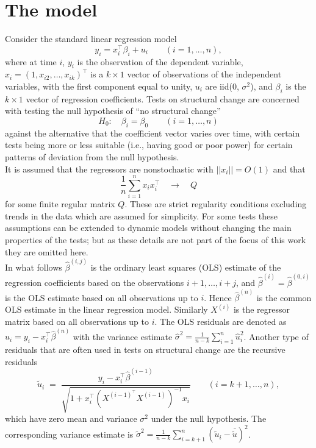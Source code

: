 \documentclass[10pt,a4paper]{article}
\begin{document}
\section{The model} \label{sec:model}
Consider the standard linear regression model
\begin{equation} \label{model1} y_i = x_i^\top \beta_i + u_i
\qquad (i = 1, \dots, n), \end{equation}
where at time $i$, $y_i$ is the observation of the dependent
variable, $x_i = (1, x_{i2}, \dots, x_{ik})^\top$ is a $k \times 1$ vector of
observations of the independent variables, with the first component equal to
unity, $u_i$ are iid(0, $\sigma^2$), and $\beta_i$ is the $k \times 1$ vector of
regression coefficients. Tests on structural change are concerned with testing
the null hypothesis of ``no structural change''
\begin{equation} \label{null-hypothesis}
H_0: \quad \beta_i = \beta_0 \qquad (i = 1, \dots, n)
\end{equation}
against
the alternative that the coefficient vector varies over time, with
certain tests being more or less suitable (i.e., having good or poor power) for
certain patterns of deviation from the null hypothesis.\\

It is assumed
that the regressors are nonstochastic with $||x_i|| = O(1)$ and that
\begin{equation} \label{A5} \frac{1}{n} \sum_{i=1}^n x_i x_i^\top \quad
\longrightarrow \quad Q\end{equation}
for some finite regular matrix $Q$. These
are strict regularity conditions excluding trends in the data which are assumed
for simplicity. For some tests these assumptions can be
extended to dynamic models without changing the main properties of the tests;
but as these details are not part of the focus of this work they are omitted
here.\\

In what follows $\hat \beta^{(i, j)}$ is the ordinary least
squares (OLS) estimate of the regression coefficients based on the
observations $i+1, \dots, i+j$, and $\hat \beta^{(i)} = \hat \beta^{(0,i)}$ is
the OLS estimate based on all observations up to $i$. Hence $\hat \beta^{(n)}$
is the common OLS estimate in the linear regression model.
Similarly $X^{(i)}$ is the regressor matrix based on all observations up to $i$.
The OLS residuals
are denoted as $\hat u_i = y_i - x_i^\top \hat \beta^{(n)}$ with the
variance estimate $\hat{\sigma}^2 = \frac{1}{n-k}
\sum_{i=1}^n \hat u_i^2$. Another type of residuals that are often used in
tests on structural change are the recursive residuals \begin{equation}
\label{rr} \tilde u_i \; = \; \frac{y_i - x_i^\top \hat
\beta^{(i-1)}}{\sqrt{1+x_i^\top \left(X^{(i-1)^\top} X^{(i-1)} \right)^{-1}x_i}}
\qquad (i = k+1, \dots, n),\end{equation} which have zero mean and variance
$\sigma^2$ under the null hypothesis. The corresponding variance estimate is
$\tilde{\sigma}^2 = \frac{1}{n-k} \sum_{i=k+1}^n (\tilde u_i - \bar{ \tilde
u})^2$.
\end{document}
